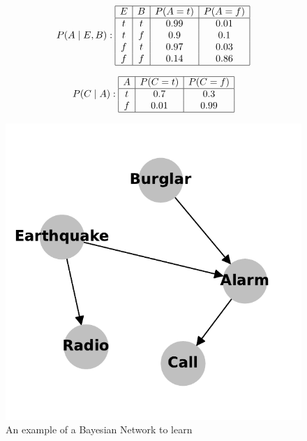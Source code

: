 \begin{figure}[htp!]
\begin{center}
\begin{minipage}{0.3\textwidth}
\[
P(A \mid E, B) :
\begin{array}{|c|c|c|c|}
\hline
E & B & P(A = t) & P(A = f) \\
\hline
t & t & 0.99 & 0.01 \\
t & f & 0.9 & 0.1 \\
f & t & 0.97 & 0.03 \\
f & f & 0.14 & 0.86 \\
\hline
\end{array}
\]
\end{minipage}
\hfill
\begin{minipage}{0.35\textwidth}
\[
P(C \mid A) :
\begin{array}{|c|c|c|}
\hline
A & P(C = t) & P(C = f) \\
\hline
t & 0.7 & 0.3 \\
f & 0.01 & 0.99 \\
\hline
\end{array}
\]
\end{minipage}
\end{center}
\centering
    \includegraphics[width=0.5\linewidth]{plots/alarm.pdf}
    \caption{An example of a Bayesian Network to learn}
\label{fig:alarm_fig}
\end{figure}


